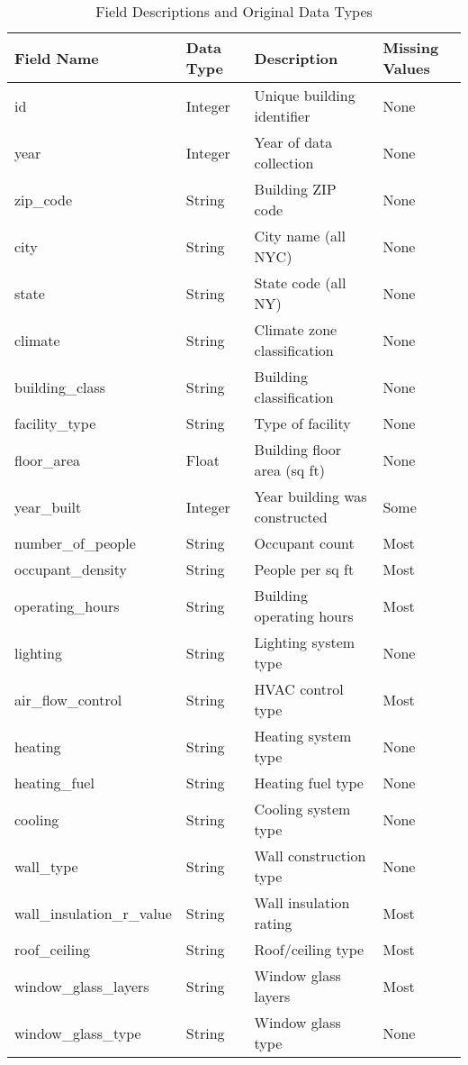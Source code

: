 \begin{table}[h]
\centering
\caption{Field Descriptions and Original Data Types}
\begin{tabular}{|l|l|l|l|}
\hline
\textbf{Field Name} & \textbf{Data Type} & \textbf{Description} & \textbf{Missing Values} \\
\hline
id & Integer & Unique building identifier & None \\
\hline
year & Integer & Year of data collection & None \\
\hline
zip\_code & String & Building ZIP code & None \\
\hline
city & String & City name (all NYC) & None \\
\hline
state & String & State code (all NY) & None \\
\hline
climate & String & Climate zone classification & None \\
\hline
building\_class & String & Building classification & None \\
\hline
facility\_type & String & Type of facility & None \\
\hline
floor\_area & Float & Building floor area (sq ft) & None \\
\hline
year\_built & Integer & Year building was constructed & Some \\
\hline
number\_of\_people & String & Occupant count & Most \\
\hline
occupant\_density & String & People per sq ft & Most \\
\hline
operating\_hours & String & Building operating hours & Most \\
\hline
lighting & String & Lighting system type & None \\
\hline
air\_flow\_control & String & HVAC control type & Most \\
\hline
heating & String & Heating system type & None \\
\hline
heating\_fuel & String & Heating fuel type & None \\
\hline
cooling & String & Cooling system type & None \\
\hline
wall\_type & String & Wall construction type & None \\
\hline
wall\_insulation\_r\_value & String & Wall insulation rating & Most \\
\hline
roof\_ceiling & String & Roof/ceiling type & Most \\
\hline
window\_glass\_layers & String & Window glass layers & Most \\
\hline
window\_glass\_type & String & Window glass type & None \\

\end{tabular}
\end{table}
